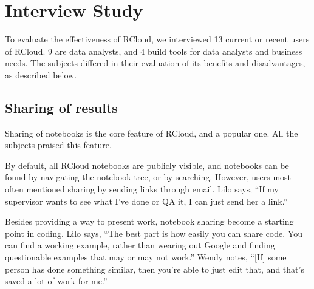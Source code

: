 \section{Interview Study\label{sec:interviews}}

To evaluate the effectiveness of RCloud, we interviewed 13 current or
recent users of RCloud. 9 are data analysts, and 4 build tools for data
analysts and business needs.
The subjects differed in their evaluation of its benefits and disadvantages,
as described below.


\subsection{Sharing of results}
Sharing of notebooks is the core feature of RCloud, and a popular one. All
the subjects praised this feature.


By default, all RCloud notebooks are publicly visible, and notebooks can be
found by navigating the notebook tree, or by searching. However, users most
often mentioned sharing by sending links through email. Lilo says,
``If my supervisor wants to see what I've done or QA it, I can just send her a link.''

Besides providing a way to present work, notebook sharing become a starting point
in coding. Lilo says, ``The best part is how easily you can
share code. You can find a working example, rather than wearing
out Google and finding questionable examples that may or may not work.'' Wendy
notes, ``[If] some person has done something similar, then you're able to just
edit that, and that's saved a lot of work for me.''

